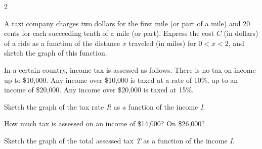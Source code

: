 \documentclass{sebase}
\begin{document}
\begin{multicols}{2}
\begin{ExerciseList}
%

%

\item[$\hfill $58.] A taxi company charges two dollars for the first mile
(or part of a mile) and 20 cents for each succeeding tenth of a mile (or
part). Express the cost $C$ (in dollars) of a ride as a function of the
distance $x$ traveled (in miles) for $0<x<2$, and sketch the graph of this
function.

%

\item[{$\hfill $\protect\fbox{\hspace{-2pt}59.\hspace{-2pt}}}] In a certain
country, income tax is assessed as follows. There is no tax on income up to
\$10,000. Any income over \$10,000 is taxed at a rate of 10\%, up to an
income of \$20,000. Any income over \$20,000 is taxed at 15\%.

\begin{ExerciseList}
\item[(a)] Sketch the graph of the tax rate \textit{R} as a function of the
income \textit{I}.

%

\item[(b)] How much tax is assessed on an income of \$14,000? On \$26,000?

%

\item[(c)] Sketch the graph of the total assessed tax \textit{T} as a
function of the income \textit{I}.


\end{ExerciseList}
\end{ExerciseList}
\end{multicols}
\end{document}
